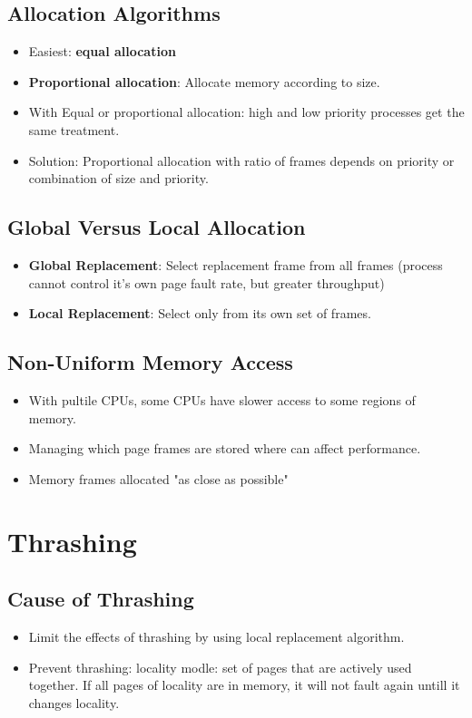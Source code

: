 \documentclass[10pt]{report}
\begin{document}
		\subsection{Allocation Algorithms}
			\begin{itemize}
				\item Easiest: \textbf{equal allocation}
				\item \textbf{Proportional allocation}: Allocate memory according to size.
				\item With Equal or proportional allocation: high and low priority processes get the same treatment.
				\item Solution: Proportional allocation with ratio of frames depends on priority or combination of size and priority.
			\end{itemize}

		\subsection{Global Versus Local Allocation}
			\begin{itemize}
				\item \textbf{Global Replacement}: Select replacement frame from all frames (process cannot control it's own page fault rate, but greater throughput)
				\item \textbf{Local Replacement}: Select only from its own set of frames.
			\end{itemize}

		\subsection{Non-Uniform Memory Access}
			\begin{itemize}
				\item With pultile CPUs, some CPUs have slower access to some regions of memory.
				\item Managing which page frames are stored where can affect performance.
				\item Memory frames allocated "as close as possible"
			\end{itemize}

	\section{Thrashing}
		\subsection{Cause of Thrashing}
			\begin{itemize}
				\item Limit the effects of thrashing by using local replacement algorithm.
				\item Prevent thrashing: locality modle: set of pages that are actively used together. If all pages of locality are in memory, it will not fault again untill it changes locality.
			\end{itemize}
\end{document}
